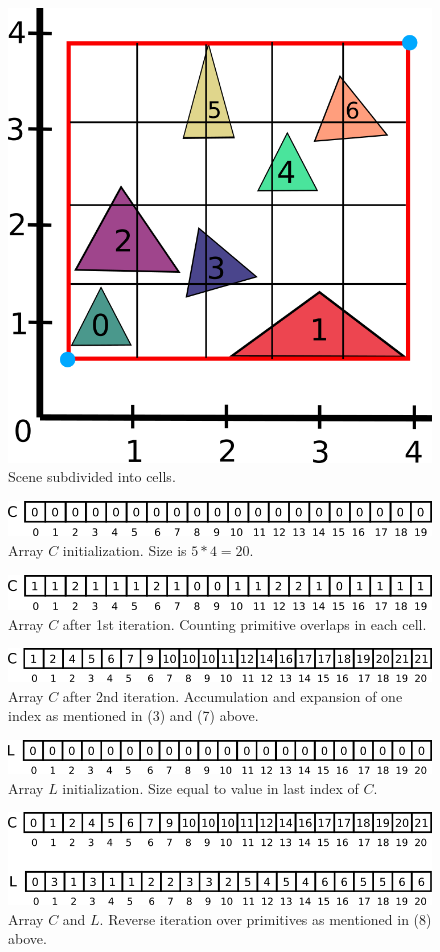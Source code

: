 \documentclass[11pt,a4paper]{article}
\begin{document}
\begin{figure}[H]
	\centering
	\captionsetup{justification=centering}
	\includegraphics[width=.3\textwidth]{compact_grid_3}\quad
	\caption{Scene subdivided into cells.}
\end{figure}
\noindent
\begin{figure}[H]
	\centering
	\captionsetup{justification=centering}
	\includegraphics[width=.65\textwidth]{compact_grid_4}\quad
	\caption{Array $C$ initialization. Size is $5 * 4 = 20$.}
\end{figure}
\noindent
\begin{figure}[H]
	\centering
	\captionsetup{justification=centering}
	\includegraphics[width=.65\textwidth]{compact_grid_5}\quad
	\caption{Array $C$ after 1st iteration. Counting primitive overlaps in each cell.}
\end{figure}
\begin{figure}[H]
	\centering
	\captionsetup{justification=centering}
	\includegraphics[width=.65\textwidth]{compact_grid_6}\quad
	\caption{Array $C$ after 2nd iteration. Accumulation and expansion of one index as mentioned in (3) and (7) above.}
\end{figure}
\begin{figure}[H]
	\centering
	\captionsetup{justification=centering}
	\includegraphics[width=.65\textwidth]{compact_grid_7}\quad
	\caption{Array $L$ initialization. Size equal to value in last index of $C$.}
\end{figure}
\begin{figure}[H]
	\centering
	\captionsetup{justification=centering}
	\includegraphics[width=.7\textwidth]{compact_grid_8}\quad
	\caption{Array $C$ and $L$. Reverse iteration over primitives as mentioned in (8) above.}
\end{figure}
\end{document}

